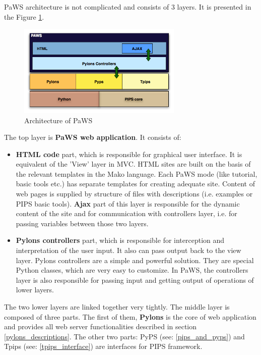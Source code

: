 PaWS architecture is not complicated and consists of 3 layers. It is presented in the Figure \ref{fig:paws_architecture}.

\begin{figure}[h!]
  \centering
  \includegraphics[width=0.7\textwidth]{reportCh2/paws}
  \caption{Architecture of PaWS}
  \label{fig:paws_architecture}
\end{figure}

The top layer is {\bf PaWS web application}. It consists of:

\begin{itemize}
  \item {\bf HTML code} part, which is responsible for graphical user interface. It is equivalent of the 'View' layer in MVC. HTML sites are built on the basis of the relevant templates in the Mako language. Each PaWS mode (like tutorial, basic tools etc.) has separate templates for creating adequate site. Content of web pages is supplied by structure of files with descriptions (i.e. examples or PIPS basic tools). {\bf Ajax} part of this layer is responsible for the dynamic content of the site and for communication with controllers layer, i.e. for passing variables between those two layers.
  \item {\bf Pylons controllers} part, which is responsible for interception and interpretation of the user input. It also can pass output back to the view layer. Pylons controllers are a simple and powerful solution. They are special Python classes, which are very easy to customize. In PaWS, the controllers layer is also responsible for passing input and getting output of operations of lower layers.
\end{itemize}

The two lower layers are linked together very tightly. The middle layer is composed of three parts. The first of them, {\bf Pylons} is the core of web application and provides all web server functionalities described in section \ref{pylons_descriptions}. The other two parts: PyPS (see: \ref{pips_and_pyps}) and Tpips (see: \ref{tpips_interface}) are interfaces for PIPS framework.

